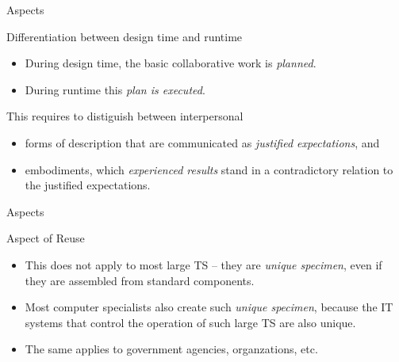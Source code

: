 \documentclass{beamer}
\begin{document}
\begin{frame}{Aspects}
  \begin{block}{Differentiation between design time and runtime}
    \begin{itemize}
    \item During design time, the basic collaborative work is \emph{planned}.
    \item During runtime this \emph{plan is executed}.
    \end{itemize}
  \end{block}
  \begin{block}{This requires to distiguish between interpersonal} 
    \begin{itemize}
    \item forms of description that are communicated as \emph{justified
      expectations}, and
    \item embodiments, which \emph{experienced results} stand in a
      contradictory relation to the justified expectations.
    \end{itemize}
  \end{block}
\end{frame}
\begin{frame}{Aspects}
  \begin{block}{Aspect of Reuse}
    \begin{itemize}
    \item This does not apply to most large TS -- they are \emph{unique
      specimen}, even if they are assembled from standard components.
    \item Most computer specialists also create such \emph{unique specimen},
      because the IT systems that control the operation of such large TS are
      also unique.
    \item The same applies to government agencies, organzations, etc.
    \end{itemize}
  \end{block}
\end{frame}
\end{document}
